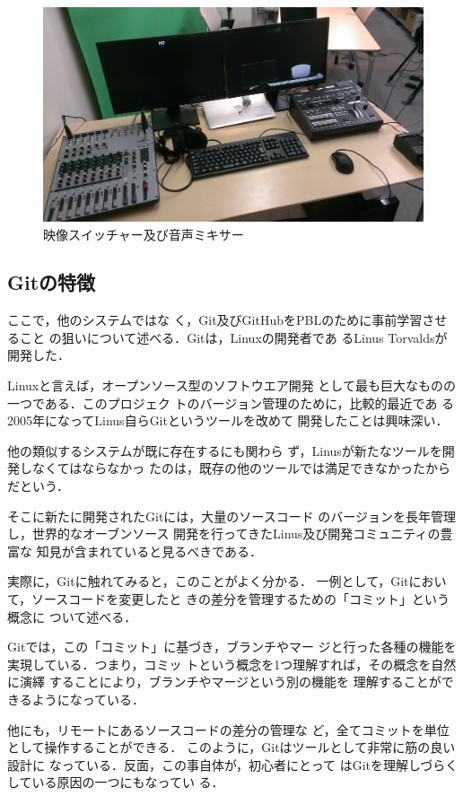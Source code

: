 \documentclass[a4j, 12Q, twocolumn, twoside]{jsarticle}
\begin{document}
\begin{figure}
 \centering
 \includegraphics[width=\linewidth]{figures/switcher.jpg}
 \caption{映像スイッチャー及び音声ミキサー}
 \label{fig:switcher}
\end{figure}

\subsection{Gitの特徴}
ここで，他のシステムではな
く，Git及びGitHubをPBLのために事前学習させること
の狙いについて述べる．Gitは，Linuxの開発者であ
るLinus Torvaldsが開発した．

Linuxと言えば，オープンソース型のソフトウエア開発
として最も巨大なものの一つである．このプロジェク
トのバージョン管理のために，比較的最近であ
る2005年になってLinus自らGitというツールを改めて
開発したことは興味深い．

他の類似するシステムが既に存在するにも関わら
ず，Linusが新たなツールを開発しなくてはならなかっ
たのは，既存の他のツールでは満足できなかったから
だという．

そこに新たに開発されたGitには，大量のソースコード
のバージョンを長年管理し，世界的なオーブンソース
開発を行ってきたLinus及び開発コミュニティの豊富な
知見が含まれていると見るべきである．

実際に，Gitに触れてみると，このことがよく分かる．
一例として，Gitにおいて，ソースコードを変更したと
きの差分を管理するための「コミット」という概念に
ついて述べる．

Gitでは，この「コミット」に基づき，ブランチやマー
ジと行った各種の機能を実現している．つまり，コミッ
トという概念を1つ理解すれば，その概念を自然に演繹
することにより，ブランチやマージという別の機能を
理解することができるようになっている．

他にも，リモートにあるソースコードの差分の管理な
ど，全てコミットを単位として操作することができる．
このように，Gitはツールとして非常に筋の良い設計に
なっている．反面，この事自体が，初心者にとって
はGitを理解しづらくしている原因の一つにもなってい
る．
\end{document}
